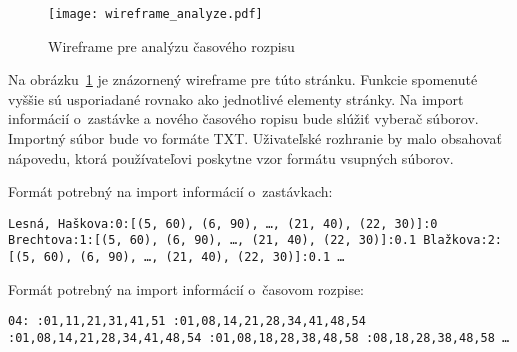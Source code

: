 \begin{figure}[h]\label{fig:wireframe_analyze}
  \centering
  \texttt{[image: wireframe\_analyze.pdf]}
  \caption{Wireframe pre analýzu časového rozpisu}
\end{figure}

Na obrázku~\ref{fig:wireframe_analyze} je znázornený wireframe pre túto stránku.
Funkcie spomenuté vyššie sú usporiadané rovnako ako jednotlivé elementy stránky.
Na import informácií o~zastávke a nového časového ropisu bude slúžiť vyberač súborov.
Importný súbor bude vo formáte TXT.
Uživateľské rozhranie by malo obsahovať nápovedu, ktorá používateľovi poskytne vzor formátu vsupných súborov.

\noindent Formát potrebný na import informácií o~zastávkach:

\noindent \texttt{Lesná, Haškova:0:[(5, 60), (6, 90), \ldots , (21, 40), (22, 30)]:0 \newline
  Brechtova:1:[(5, 60), (6, 90), \ldots , (21, 40), (22, 30)]:0.1 \newline
  Blažkova:2:[(5, 60), (6, 90), \ldots , (21, 40), (22, 30)]:0.1 \newline
  \ldots
}

\noindent Formát potrebný na import informácií o~časovom rozpise:

\noindent \texttt{04: :01,11,21,31,41,51 :01,08,14,21,28,34,41,48,54 :01,08,14,21,28,34,41,48,54 :01,08,18,28,38,48,58 :08,18,28,38,48,58 \newline
  \ldots
}

